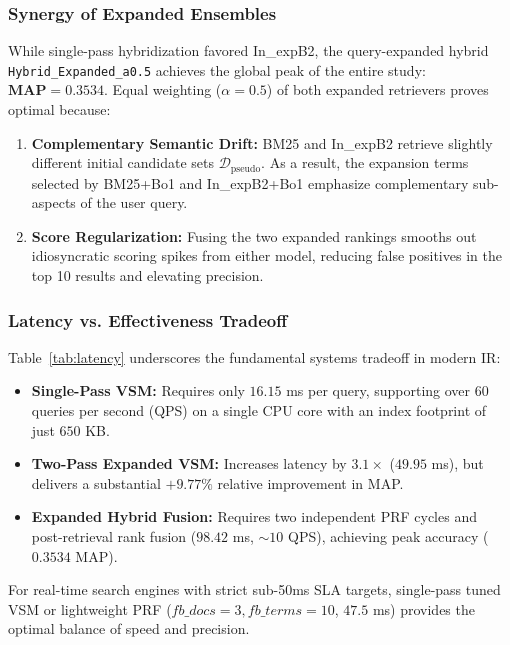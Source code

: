 \documentclass[10pt, a4paper]{article}
\begin{document}
\subsubsection{Synergy of Expanded Ensembles}
While single-pass hybridization favored In\_expB2, the query-expanded hybrid \texttt{Hybrid\_Expanded\_a0.5} achieves the global peak of the entire study: $\mathbf{MAP = 0.3534}$. Equal weighting ($\alpha=0.5$) of both expanded retrievers proves optimal because:
\begin{enumerate}[noitemsep,topsep=2pt]
    \item \textbf{Complementary Semantic Drift:} BM25 and In\_expB2 retrieve slightly different initial candidate sets $\mathcal{D}_{\text{pseudo}}$. As a result, the expansion terms selected by BM25+Bo1 and In\_expB2+Bo1 emphasize complementary sub-aspects of the user query.
    \item \textbf{Score Regularization:} Fusing the two expanded rankings smooths out idiosyncratic scoring spikes from either model, reducing false positives in the top 10 results and elevating precision.
\end{enumerate}

\subsubsection{Latency vs. Effectiveness Tradeoff}
Table~\ref{tab:latency} underscores the fundamental systems tradeoff in modern IR:
\begin{itemize}[noitemsep,topsep=2pt]
    \item \textbf{Single-Pass VSM:} Requires only $16.15$ ms per query, supporting over 60 queries per second (QPS) on a single CPU core with an index footprint of just $650$ KB.
    \item \textbf{Two-Pass Expanded VSM:} Increases latency by $3.1\times$ ($49.95$ ms), but delivers a substantial $+9.77\%$ relative improvement in MAP.
    \item \textbf{Expanded Hybrid Fusion:} Requires two independent PRF cycles and post-retrieval rank fusion ($98.42$ ms, $\sim 10$ QPS), achieving peak accuracy ($0.3534$ MAP).
\end{itemize}
For real-time search engines with strict sub-50ms SLA targets, single-pass tuned VSM or lightweight PRF ($fb\_docs=3, fb\_terms=10$, $47.5$ ms) provides the optimal balance of speed and precision.

\end{document}
